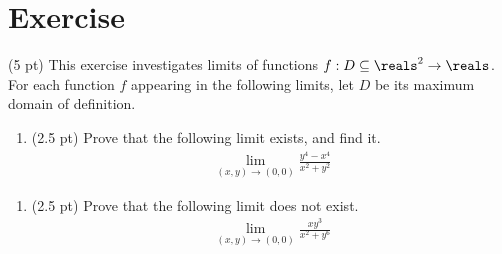 \section{Exercise}

(5 pt) This exercise investigates limits of functions $f: D \subseteq \reals^{2} \rightarrow \reals$. For each function $f$ appearing in the following limits, let $D$ be its maximum domain of definition.
\begin{enumerate}[label=(\alph*)]
\item (2.5 pt) Prove that the following limit exists, and find it.
\begin{align*}
\lim_{(x,y) \rightarrow (0,0)} \frac{y^{4} - x^{4}}{x^{2} + y^{2}}
\end{align*}
\end{enumerate}

\spaceSolution{2.5in}{%
}%

\begin{enumerate}[resume,label=(\alph*)]
\item (2.5 pt) Prove that the following limit does not exist.%
\begin{align*}
\lim_{(x,y) \rightarrow (0,0)} \frac{x y^{3}}{x^{2} + y^{6}}
\end{align*}
\end{enumerate}

\spaceSolution{2.5in}{%
}%